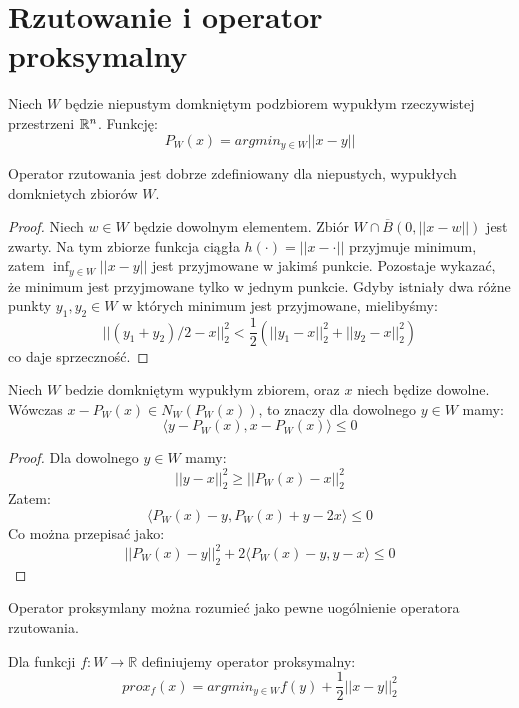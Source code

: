 \documentclass[10pt,a4paper,draft]{report}
\begin{document}
\section{Rzutowanie i operator proksymalny}

\begin{definition}
Niech $W$ będzie niepustym domkniętym podzbiorem wypukłym rzeczywistej przestrzeni $\mathbb{R}^n$. Funkcję:
\[
P_W(x) = argmin_{y \in W} ||x - y||
\]
\end{definition}
\begin{theorem}
Operator rzutowania jest dobrze zdefiniowany dla niepustych, wypukłych domknietych zbiorów $W$.
\end{theorem}
\begin{proof}
Niech $w \in W$ będzie dowolnym elementem. Zbiór $W \cap \overline{B}(0, ||x - w||)$ jest zwarty. Na tym zbiorze funkcja ciągła $h(\cdot) = ||x - \cdot||$ przyjmuje minimum, zatem $\inf_{y \in W} ||x - y||$ jest przyjmowane w jakimś punkcie. Pozostaje wykazać, że minimum jest przyjmowane tylko w jednym punkcie. Gdyby istniały dwa różne punkty $y_1, y_2 \in W$ w których minimum jest przyjmowane, mielibyśmy:
\[
||(y_1 + y_2)/2 - x||_2^2 < \frac{1}{2} \left( ||y_1 - x||_2^2 + ||y_2 - x||_2^2 \right)
\]
co daje sprzeczność.
\end{proof}

\begin{theorem}
Niech $W$ bedzie domkniętym wypukłym zbiorem, oraz $x$ niech będize dowolne. Wówczas $x - P_W(x) \in N_W(P_W(x))$, to znaczy dla dowolnego $y \in W$ mamy:
\[
\langle y - P_W(x), x - P_W(x) \rangle \leq 0 
\]
\end{theorem}
\begin{proof}
Dla dowolnego $y \in W$ mamy:
\[
||y - x||_2^2 \geq ||P_W(x) - x||_2^2
\]
Zatem:
\[
\langle P_W(x) - y , P_W(x) + y - 2x \rangle \leq 0
\]
Co można przepisać jako:
\[
||P_W(x) - y||_2^2 + 2 \langle P_W(x) - y , y - x \rangle \leq 0
\]
\end{proof}


Operator proksymlany można rozumieć jako pewne uogólnienie operatora rzutowania.

\begin{definition}
Dla funkcji $f : W \rightarrow \mathbb{R}$ definiujemy operator proksymalny:
\begin{equation}\label{eq:def_prox}
prox_f(x) = argmin_{y \in W} f(y) + \frac{1}{2}||x-y||_2^2 
\end{equation}
\end{definition}
\end{document}
